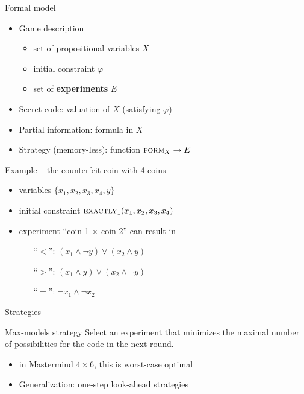 \documentclass{beamer}
\begin{document}
\begin{frame}{Formal model}
\begin{itemize}
\item Game description
\begin{itemize}
\item set of propositional variables $X$
\item initial constraint $\varphi$
\item set of \textbf{experiments} $E$
\end{itemize}

\item Secret code: valuation of $X$ (satisfying $\varphi$)
\item Partial information: formula in $X$
\item Strategy (memory-less): function $\textsc{form}_X \rightarrow E$
\end{itemize}
\end{frame}

\begin{frame}{Example -- the counterfeit coin with 4 coins}
\begin{itemize}
\item variables $\{x_1, x_2, x_3, x_4, y\}$
\item initial constraint $\textsc{exactly}_1(x_1, x_2, x_3, x_4)$
\item experiment ``coin 1 $\times$ coin 2'' can result in \medskip
  \begin{enumerate}\itemsep 5pt
  \item[``$<$'':] $(x_1\wedge \neg y) \vee (x_2\wedge y)$
  \item[``$>$'':] $(x_1 \wedge y) \vee (x_2\wedge\neg y)$
  \item[``$=$'':] $\neg x_1 \wedge \neg x_2 $
  \end{enumerate}
\end{itemize}
\end{frame}

\begin{frame}{Strategies}

\begin{block}{Max-models strategy}
Select an experiment that minimizes the maximal number
  of possibilities for the code in the next round.
\end{block}

\bigskip
\begin{itemize}\itemsep 5pt
\item in Mastermind $4\times6$, this is worst-case optimal
\item Generalization: one-step look-ahead strategies
\end{itemize}

\end{frame}
\end{document}
